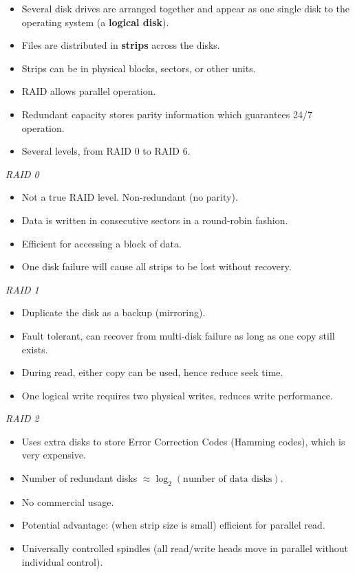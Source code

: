 \begin{itemize}
    \item Several disk drives are arranged together and appear as one single disk to the operating
        system (a \textbf{logical disk}).
    \item Files are distributed in \textbf{strips} across the disks.
    \item Strips can be in physical blocks, sectors, or other units.
    \item RAID allows parallel operation.
    \item Redundant capacity stores parity information which guarantees 24/7 operation.
    \item Several levels, from RAID 0 to RAID 6.
\end{itemize}

\emph{RAID 0}

\begin{itemize}
    \item Not a true RAID level. Non-redundant (no parity).
    \item Data is written in consecutive sectors in a round-robin fashion.
    \item Efficient for accessing a block of data.
    \item One disk failure will cause all strips to be lost without recovery.
\end{itemize}

\emph{RAID 1}

\begin{itemize}
    \item Duplicate the disk as a backup (mirroring).
    \item Fault tolerant, can recover from multi-disk failure as long as one copy still exists.
    \item During read, either copy can be used, hence reduce seek time.
    \item One logical write requires two physical writes, reduces write performance.
\end{itemize}

\emph{RAID 2}

\begin{itemize}
    \item Uses extra disks to store Error Correction Codes (Hamming codes), which is
        very expensive.
    \item Number of redundant disks $\approx \log_2 (\text{number of data disks})$.
    \item No commercial usage.
    \item Potential advantage: (when strip size is small) efficient for parallel read.
    \item Universally controlled spindles (all read/write heads move in parallel without
        individual control).
\end{itemize}

